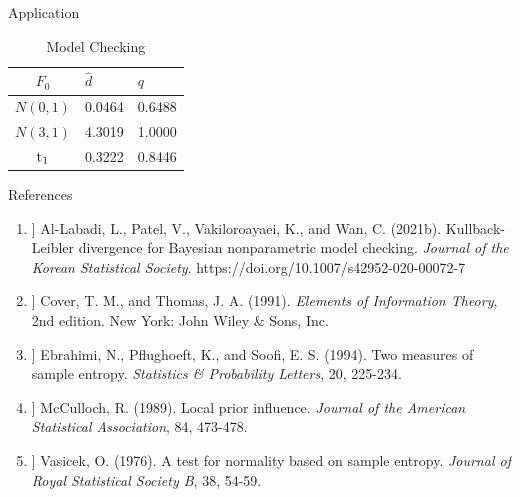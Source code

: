 \documentclass[final]{beamer}
\newlength{\onecolwid}
\begin{document}
\begin{frame}[t]
\begin{columns}[t]
\begin{column}{\onecolwid}
\begin{block}{Application}
\bigskip
\begin{table}[H]
\centering
\begin{tabular}
[c]{|c|l|l|}\hline
$F_0$  & $\hat{d}$ & $q$ \\
\hline
$N(0,1)$& 0.0464& 0.6488  \\
  \hline
$N(3,1)$& 4.3019 &1.0000  \\
  \hline
${\rm t}_{1}$ &0.3222& 0.8446 \\
  \hline
\end{tabular}
\caption{Model Checking}
\end{table}%

    \end{block}


    \begin{block}{References}
        \small
        \begin{enumerate} 
            \item [[1]] Al-Labadi, L., Patel, V.,  Vakiloroayaei, K., and  Wan, C. (2021b). Kullback-Leibler divergence for Bayesian nonparametric model checking.  
            \emph{Journal of the Korean Statistical Society}. https://doi.org/10.1007/s42952-020-00072-7
            \item [[2]] Cover, T. M., and  Thomas, J. A. (1991).  \emph{Elements of Information Theory}, 2nd edition.  New York: John Wiley \& Sons, Inc.
            \item  [[3]] Ebrahimi, N., Pflughoeft, K., and Soofi, 
            E. S. (1994). Two measures of sample entropy. \emph{Statistics \& Probability Letters}, 20, 225-234.
            
            \item  [[4]] McCulloch, R. (1989). Local prior influence. {\it Journal of the American Statistical Association}, 84, 473-478.
            
            \item [[5]] Vasicek, O. (1976). A test for normality based on sample entropy. \emph{Journal of Royal Statistical Society B}, 38, 54-59.
        \end{enumerate}

        


\end{block}
\end{column}
\end{columns}
\end{frame}
\end{document}
